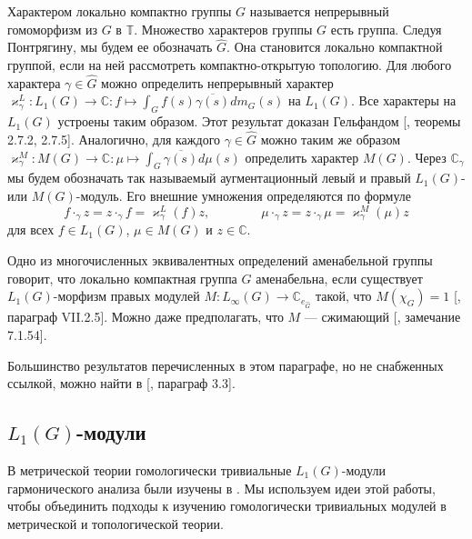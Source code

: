 Характером локально компактно группы $G$ называется непрерывный гомоморфизм из $G$ в $\mathbb{T}$. Множество характеров группы $G$ есть группа. Следуя Понтрягину, мы будем ее обозначать $\widehat{G}$. Она становится локально компактной группой, если на ней рассмотреть компактно-открытую топологию. Для любого характера $\gamma\in\widehat{G}$ можно определить непрерывный характер $\varkappa_\gamma^L:L_1(G)\to\mathbb{C}:f\mapsto \int_G f(s)\overline{\gamma(s)}dm_G(s)$ на $L_1(G)$. Все характеры на $L_1(G)$ устроены таким образом. Этот результат доказан Гельфандом [\cite{KaniBanAlg}, теоремы 2.7.2, 2.7.5]. Аналогично, для каждого $\gamma\in\widehat{G}$ можно таким же образом $\varkappa_\gamma^M:M(G)\to\mathbb{C}:\mu\mapsto\int_{G} \overline{\gamma(s)}d\mu(s)$ определить характер $M(G)$. Через $\mathbb{C}_\gamma$ мы будем обозначать так называемый аугментационный левый и правый $L_1(G)$- или $M(G)$-модуль. Его внешние умножения определяются по формуле
$$
f\cdot_{\gamma}z=z\cdot_{\gamma}f=\varkappa_\gamma^L(f)z,
\qquad\qquad
\mu\cdot_{\gamma}z=z\cdot_{\gamma}\mu=\varkappa_\gamma^M(\mu)z
$$
для всех $f\in L_1(G)$, $\mu\in M(G)$ и $z\in\mathbb{C}$. 

Одно из многочисленных эквивалентных определений аменабельной группы говорит, что локально компактная группа $G$ аменабельна, если существует $L_1(G)$-морфизм правых модулей $M:L_\infty(G)\to\mathbb{C}_{e_{\widehat{G}}}$ такой, что $M(\chi_G)=1$ [\cite{HelBanLocConvAlg}, параграф VII.2.5]. Можно даже предполагать, что $M$ --- сжимающий [\cite{HelBanLocConvAlg}, замечание 7.1.54].

Большинство результатов перечисленных в этом параграфе, но не снабженных ссылкой, можно найти в [\cite{DalBanAlgAutCont}, параграф 3.3].


\subsection{\texorpdfstring{$L_1(G)$}{L1(G)}-модули}
\label{SubSectionL1GModules}

В метрической теории гомологически тривиальные $L_1(G)$-модули гармонического анализа были изучены в \cite{GravInjProjBanMod}. Мы используем идеи этой работы, чтобы объединить подходы к изучению гомологически тривиальных модулей в метрической и топологической теории. 

